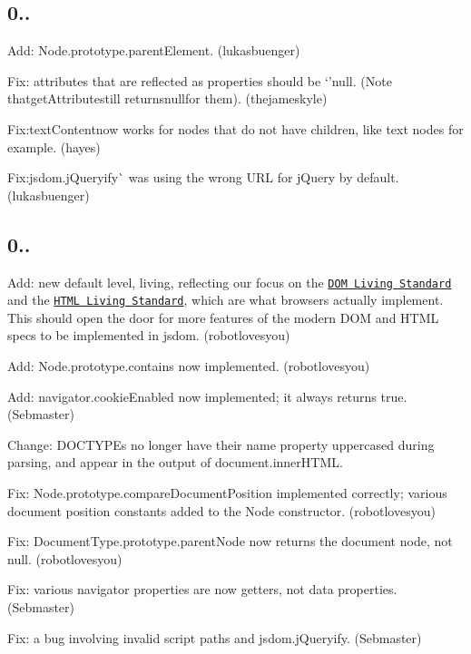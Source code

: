 \subsection*{0..}


\begin{DoxyItemize}
\item Add\+: {\ttfamily Node.\+prototype.\+parent\+Element}. (lukasbuenger)
\item Fix\+: attributes that are reflected as properties should be `'null{\ttfamily . (Note that}get\+Attribute{\ttfamily still returns}null{\ttfamily for them). (thejameskyle)}
\item {\ttfamily Fix\+:}text\+Content{\ttfamily now works for nodes that do not have children, like text nodes for example. (hayes)}
\item {\ttfamily Fix\+:}jsdom.\+j\+Queryify\`{} was using the wrong U\+RL for j\+Query by default. (lukasbuenger)
\end{DoxyItemize}

\subsection*{0..}


\begin{DoxyItemize}
\item Add\+: new default level, {\ttfamily living}, reflecting our focus on the \href{http://dom.spec.whatwg.org/}{\tt D\+OM Living Standard} and the \href{http://www.whatwg.org/specs/web-apps/current-work/multipage/}{\tt H\+T\+ML Living Standard}, which are what browsers actually implement. This should open the door for more features of the modern D\+OM and H\+T\+ML specs to be implemented in jsdom. (robotlovesyou)
\item Add\+: {\ttfamily Node.\+prototype.\+contains} now implemented. (robotlovesyou)
\item Add\+: {\ttfamily navigator.\+cookie\+Enabled} now implemented; it always returns {\ttfamily true}. (Sebmaster)
\item Change\+: D\+O\+C\+T\+Y\+P\+Es no longer have their {\ttfamily name} property uppercased during parsing, and appear in the output of {\ttfamily document.\+inner\+H\+T\+ML}.
\item Fix\+: {\ttfamily Node.\+prototype.\+compare\+Document\+Position} implemented correctly; various document position constants added to the {\ttfamily Node} constructor. (robotlovesyou)
\item Fix\+: {\ttfamily Document\+Type.\+prototype.\+parent\+Node} now returns the document node, not {\ttfamily null}. (robotlovesyou)
\item Fix\+: various {\ttfamily navigator} properties are now getters, not data properties. (Sebmaster)
\item Fix\+: a bug involving invalid script paths and {\ttfamily jsdom.\+j\+Queryify}. (Sebmaster)
\end{DoxyItemize}

